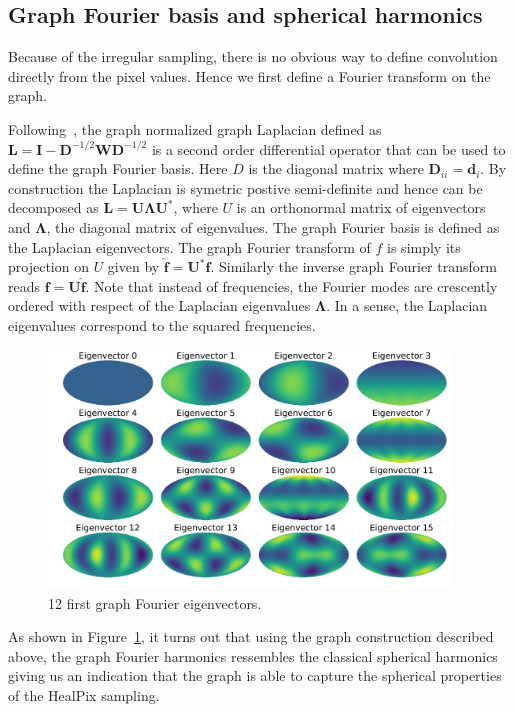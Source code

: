 \documentclass[final,twocolumn,3p,times,authoryear]{elsarticle}
\newcommand{\todo}[1]{{\color[rgb]{.6,.1,.6}{#1}}}
\renewcommand{\b}[1]{{\bm{#1}}}   %
\newcommand{\1}{\b{1}}              %
\newcommand{\0}{\b{0}}              %
\renewcommand{\L}{\b{L}} %
\newcommand{\W}{\b{W}}
\newcommand{\I}{\b{I}}
\newcommand{\D}{\b{D}}
\newcommand{\U}{\b{U}}
\newcommand{\bLambda}{\b{\Lambda}}
\begin{document}
\subsection{Graph Fourier basis and spherical harmonics}
\todo{Add a few extra references}

Because of the irregular sampling, there is no obvious way to define convolution
directly from the pixel values. Hence we first define a Fourier transform on the
graph.

Following~\cite{shuman2013emerging}, the graph normalized graph Laplacian
defined as $\L = \I - \D^{-1/2} \W \D^{-1/2}$ is a second order differential operator
that can be used to define the graph Fourier basis. Here $D$ is the diagonal
matrix where $\D_{ii}=\b{d}_i$. By construction the Laplacian is symetric postive
semi-definite and hence can be decomposed as $\L=\U \bLambda \U^*$, where $U$ is an
orthonormal matrix of eigenvectors and $\bLambda$, the diagonal matrix of
eigenvalues. The graph Fourier basis is defined as the Laplacian eigenvectors.
The graph Fourier transform of $f$ is simply its projection on $U$ given by 
$\hat{\b{f}}=\U^*\b{f}$. Similarly the inverse graph Fourier transform reads $\b{f}=\U\hat{\b{f}}$.
Note that instead of frequencies, the Fourier modes are crescently ordered with
respect of the Laplacian eigenvalues $\bLambda$. In a sense, the Laplacian
eigenvalues correspond to the squared frequencies. 

\begin{figure}[!ht]
\centering
\includegraphics[width=0.95\textwidth]{figures/eigenvectors.pdf}
\caption{12 first graph Fourier eigenvectors.}
\label{fig:graph_harmonics}
\end{figure}

As shown in Figure~\ref{fig:graph_harmonics}, it turns out that using the graph
construction described above, the graph Fourier harmonics ressembles the
classical spherical harmonics giving us an indication that the graph is able to
capture the spherical properties of the HealPix sampling.
\end{document}
